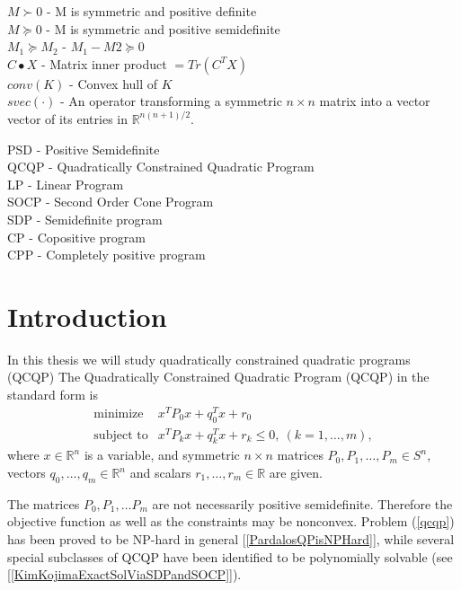 \documentclass[12pt]{book}
\theoremstyle{definition}
\begin{document}
$M\succ 0$ - M is symmetric and positive definite \\
$M\succeq 0$ - M is symmetric and positive semidefinite \\
$M_1 \succeq M_2$ - $M_1 - M2\succeq 0$ \\
$C\bullet X$ - Matrix inner product $=Tr(C^TX)$ \\

$conv(K)$ - Convex hull of $K$ \\
$svec(\cdot)$ - An operator transforming a symmetric $n\times n$ matrix into a vector vector of its entries in $\mathbb{R}^{n(n+1)/2}$.


PSD - Positive Semidefinite \\

QCQP - Quadratically Constrained Quadratic Program \\
LP - Linear Program \\
SOCP - Second Order Cone Program \\
SDP - Semidefinite program \\
CP - Copositive program \\
CPP - Completely positive program \\




\mainmatter

\chapter*{Introduction}

In this thesis we will study quadratically constrained quadratic programs (QCQP)
\label{defQCQP}
The Quadratically Constrained Quadratic Program (QCQP) in the standard form is
\begin{equation}
\label{qcqp} 
\begin{array}{ll}
\mbox{minimize}& x^TP_0x + q_0^Tx +r_0 \\
\mbox{subject to}& x^TP_kx + q_k^Tx + r_k \leq 0, \  (k = 1,\dots ,m),
\end{array} 
\end{equation}
where $x\in \mathbb{R}^n$ is a variable, and symmetric $n\times n$ matrices $P_0, P_1, \dots ,P_m \in S^n$, vectors $q_0,\dots ,q_m \in \mathbb{R}^n$ and scalars $r_1,\dots ,r_m\in \mathbb{R}$ are given.

The matrices $P_0, P_1, \dots P_m$ are not necessarily positive semidefinite. Therefore the objective function as well as the constraints may be nonconvex. Problem (\ref{qcqp}) has been proved to be NP-hard in general [\ref{PardalosQPisNPHard}], while several special subclasses
of QCQP have been identified to be polynomially solvable (see [\ref{KimKojimaExactSolViaSDPandSOCP}]).
\end{document}
